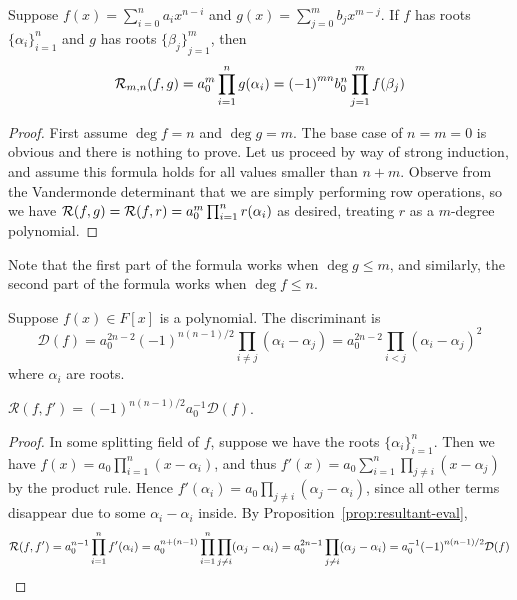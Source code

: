 \begin{proposition}\label{prop:resultant-eval}
    Suppose \(f(x) = \sum_{i=0}^n a_i x^{n-i}\) and \(g(x) = \sum_{j=0}^m b_j x^{m-j}\).
    If \(f\) has roots \({\{\alpha_i\}}_{i=1}^n\)
    and \(g\) has roots \({\{\beta_j\}}_{j=1}^m\), then
    \begin{equation*}
        \mathcal{R}_{m,n}(f,g) = a_0^m \prod_{i=1}^n g(\alpha_i)
        = {(-1)}^{mn} b_0^n \prod_{j=1}^m f(\beta_j)
    \end{equation*}
\end{proposition}
\begin{proof}
    First assume \(\deg f = n\) and \(\deg g = m\).
    The base case of \(n = m = 0\) is obvious and there is nothing to prove.
    Let us proceed by way of strong induction,
    and assume this formula holds for all values smaller than \(n+m\).
    Observe from the Vandermonde determinant
    that we are simply performing row operations,
    so we have \(\mathcal{R}(f,g) = \mathcal{R}(f,r) = a_0^m \prod_{i=1}^n r(\alpha_i)\)
    as desired,
    treating \(r\) as a \(m\)-degree polynomial.
\end{proof}
\begin{remark}
    Note that the first part of the formula works when \(\deg g \leq m\),
    and similarly, the second part of the formula works when \(\deg f \leq n\).
\end{remark}

\begin{definition}
    Suppose \(f(x) \in F[x]\) is a polynomial.
    The discriminant is
    \begin{equation*}
        \mathcal{D}(f) = a_0^{2n-2} {(-1)}^{n(n-1)/2}
        \prod_{i \neq j} (\alpha_i - \alpha_j)
        = a_0^{2n-2} \prod_{i<j} {(\alpha_i - \alpha_j)}^2
    \end{equation*}
    where \(\alpha_i\) are roots.
\end{definition}
\begin{proposition}
    \(\mathcal{R}(f,f') = {(-1)}^{n(n-1)/2} a_0^{-1} \mathcal{D}(f)\).
\end{proposition}
\begin{proof}
    In some splitting field of \(f\),
    suppose we have the roots \({\{\alpha_i\}}_{i=1}^n\).
    Then we have \(f(x) = a_0 \prod_{i=1}^n (x-\alpha_i)\),
    and thus \(f'(x) = a_0 \sum_{i=1}^n \prod_{j \neq i} (x-\alpha_j)\)
    by the product rule.
    Hence \(f'(\alpha_i) = a_0 \prod_{j \neq i} (\alpha_j - \alpha_i)\),
    since all other terms disappear due to some \(\alpha_i - \alpha_i\) inside.
    By Proposition~\ref{prop:resultant-eval},
    \begin{equation*}
        \mathcal{R}(f,f') = a_0^{n-1} \prod_{i=1}^n f'(\alpha_i)
        = a_0^{n+(n-1)} \prod_{i=1}^n \prod_{j \neq i} (\alpha_j - \alpha_i)
        = a_0^{2n-1} \prod_{j \neq i} (\alpha_j - \alpha_i)
        = a_0^{-1} {(-1)}^{n(n-1)/2} \mathcal{D}(f)
    \end{equation*}
\end{proof}

